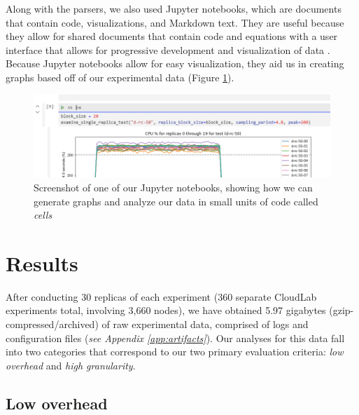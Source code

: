 \documentclass[a4paper,11pt]{article}
\newcommand{\granularity}{\textit{high granularity}\xspace}
\newcommand{\overhead}{\textit{low overhead}\xspace}
\begin{document}
Along with the parsers, we also used Jupyter notebooks,
which are documents that contain code, visualizations, and Markdown text.
They are useful because they allow for shared documents that contain code and equations
with a user interface that allows for progressive development and visualization of data .
Because Jupyter notebooks allow for easy visualization,
they aid us in creating graphs based off of our experimental data (Figure \ref{fig:jupyter_scrot}).

\begin{figure}[h]
    \centering
    \vspace{-0.2em}
    \includegraphics[width=\textwidth]{images/jupyter.png}
    \vspace{0.1em}
    \caption{
        Screenshot of one of our Jupyter notebooks,
        showing how we can generate graphs and analyze our data in small units
        of code called \textit{cells}
    }
    \label{fig:jupyter_scrot}
    \vspace{0.7em}
\end{figure}

\pagebreak
\section{Results}

After conducting 30 replicas of each experiment
(360 separate CloudLab experiments total, involving 3,660 nodes),
we have obtained 5.97 gigabytes (gzip-compressed/archived) of raw experimental data,
comprised of logs and configuration files (\textit{see Appendix \ref{app:artifacts}}).
Our analyses for this data fall into two categories that correspond to our two primary evaluation criteria:
\overhead and \granularity.

\subsection{Low overhead}
\end{document}
